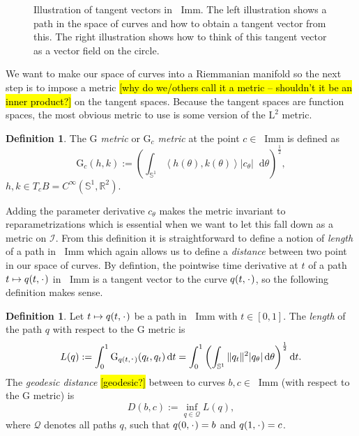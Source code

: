\documentclass[a4,danish]{article}
\theoremstyle{break}
\theoremstyle{definition}
\newtheorem{definition}[subsection]{Definition}
\theoremstyle{Break}
\newcommand{\R}{\mathbb{R}}
\newcommand*\I{\mathop{}\!\mathrm{Imm}}
\renewcommand{\S}{\mathbb{S}}
\newcommand{\blank}{\makebox[1ex]{\textbf{$\cdot$}}}
\newcommand*\diff{\mathop{}\!\mathrm{d}}
\begin{document}
\begin{figure}
\begin{subfigure}{.49\textwidth}
  \end{subfigure}
  \caption{Illustration of tangent vectors in $\I$. The left illustration shows a path in the space of curves and how to obtain a tangent vector from this. The right illustration shows how to think of this tangent vector as a vector field on the circle.}
  \label{fig:def-tang-imm}
\end{figure}

We want to make our space of curves into a Riemmanian manifold so the next step is to impose a metric
\hl{[why do we/others call it a metric -- shouldn't it be an inner product?]}
on the tangent spaces. Because the tangent spaces are function spaces, the most obvious metric to use is some version of the $\mathrm{L}^2$ metric. 

\begin{definition}
  The \textit{$\mathrm{G}$ metric} or \textit{$\mathrm{G}_c$ metric} at the point $c \in \I$ is defined as
  \begin{equation*}
    \mathrm{G}_c(h,k) := 
    \left(
      \int_{\S^{1}} \left\langle{h(\theta)
          , k(\theta)}\right\rangle |c_{\theta}| \diff \theta
    \right)^{\frac{1}{2}},
  \end{equation*}
  $h,k \in T_cB = C^{\infty}(\S^1,\R^2)$.
\end{definition}

Adding the parameter derivative $c_{\theta}$ makes the metric invariant to reparametrizations which is essential when we want to let this fall down as a metric on $\mathcal{I}$. From this definition it is straightforward to define a notion of \textit{length} of a path in $\I$ which again allows us to define a \textit{distance} between two point in our space of curves. By defintion, the pointwise time derivative at $t$ of a path $t \mapsto q(t, \blank)$ in $\I$ is a tangent vector to the curve $q(t,\blank)$, so the following definition makes sense.

\begin{definition}
  \label{def:length-in-imm}
  Let $t \mapsto q(t,\blank)$ be a path in $\I$ with $t \in [0,1]$. The \textit{length} of the path $q$ with respect to the $\mathrm{G}$ metric  is
  \begin{equation*}
    L(q) := \int_{0}^{1} \mathrm{G}_{q(t,\blank)}(q_t,q_t) \diff t =
    \int_{0}^{1}
    \left(
      \int_{\S^{1}} \|q_t\|^2 |q_{\theta}| \diff \theta
    \right)^{\frac{1}{2}}
    \diff t.
  \end{equation*}
  The \textit{geodesic distance} \hl{[geodesic?]} between to curves $b,c \in \I$ (with respect to the $\mathrm{G}$ metric) is
  \begin{equation*}
    D(b,c) := \inf_{q \in \mathcal{Q}} L(q),
  \end{equation*}
  where $\mathcal{Q}$ denotes all paths $q$, such that $q(0,\blank)=b$ and $q(1,\blank)=c$.
\end{definition}
\end{document}

